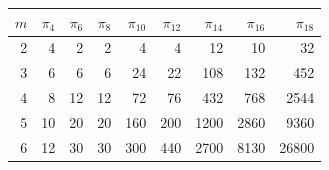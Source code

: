 \begin{tabular}{rrrrrrrrr}\toprule $m$ & $\pi_4$ & $\pi_6$ & $\pi_8$ & $\pi_{10}$ & $\pi_{12}$ & $\pi_{14}$ & $\pi_{16}$ & $\pi_{18}$\\\midrule
2 & 4 & 2 & 2 & 4 & 4 & 12 & 10 & 32\\
3 & 6 & 6 & 6 & 24 & 22 & 108 & 132 & 452\\
4 & 8 & 12 & 12 & 72 & 76 & 432 & 768 & 2544\\
5 & 10 & 20 & 20 & 160 & 200 & 1200 & 2860 & 9360\\
6 & 12 & 30 & 30 & 300 & 440 & 2700 & 8130 & 26800\\
\bottomrule\end{tabular}
